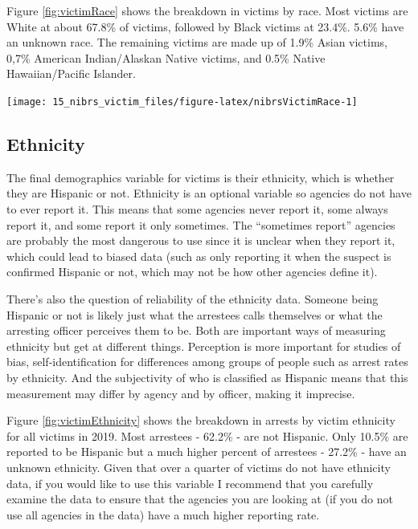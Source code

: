 \documentclass[
]{krantz}
\let\origfigure\figure
\let\endorigfigure\endfigure
\renewenvironment{figure}[1][2] {
    \expandafter\origfigure\expandafter[H]
} {
    \endorigfigure
}
\begin{document}
Figure \ref{fig:victimRace} shows the breakdown in victims
by race. Most victims are White at about 67.8\% of victims,
followed by Black victims at 23.4\%. 5.6\% have an unknown
race. The remaining victims are made up of 1.9\% Asian
victims, 0,7\% American Indian/Alaskan Native victims, and
0.5\% Native Hawaiian/Pacific Islander.

\begin{figure}

{\centering \texttt{[image: 15\_nibrs\_victim\_files/figure-latex/nibrsVictimRace-1]} 

}

\caption{The share of victims by race, 1991-2022.}\label{fig:nibrsVictimRace}
\end{figure}

\subsection{Ethnicity}\label{ethnicity-3}

The final demographics variable for victims is their
ethnicity, which is whether they are Hispanic or not.
Ethnicity is an optional variable so agencies do not have to
ever report it. This means that some agencies never report
it, some always report it, and some report it only
sometimes. The ``sometimes report'' agencies are probably
the most dangerous to use since it is unclear when they
report it, which could lead to biased data (such as only
reporting it when the suspect is confirmed Hispanic or not,
which may not be how other agencies define it).

There's also the question of reliability of the ethnicity
data. Someone being Hispanic or not is likely just what the
arrestees calls themselves or what the arresting officer
perceives them to be. Both are important ways of measuring
ethnicity but get at different things. Perception is more
important for studies of bias, self-identification for
differences among groups of people such as arrest rates by
ethnicity. And the subjectivity of who is classified as
Hispanic means that this measurement may differ by agency
and by officer, making it imprecise.

Figure \ref{fig:victimEthnicity} shows the breakdown in
arrests by victim ethnicity for all victims in 2019. Most
arrestees - 62.2\% - are not Hispanic. Only 10.5\% are
reported to be Hispanic but a much higher percent of
arrestees - 27.2\% - have an unknown ethnicity. Given that
over a quarter of victims do not have ethnicity data, if you
would like to use this variable I recommend that you
carefully examine the data to ensure that the agencies you
are looking at (if you do not use all agencies in the data)
have a much higher reporting rate.
\end{document}

